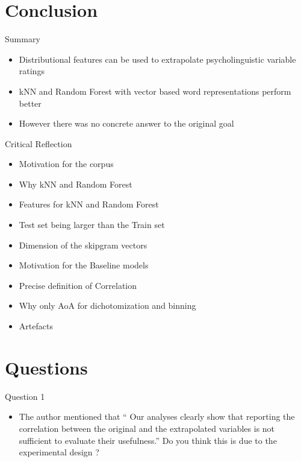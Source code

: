 \documentclass{beamer}
\begin{document}


\section{Conclusion}
\begin{frame}{Summary}
    \begin{itemize}
        \item Distributional features can be used to extrapolate psycholinguistic variable ratings
        \item kNN and Random Forest with vector based word representations perform better
        \item However there was no concrete answer to the original goal
    \end{itemize}
\end{frame}

\begin{frame}{Critical Reflection}
    \begin{itemize}
        \item Motivation for the corpus
        \item Why kNN and Random Forest
        \item Features for kNN and Random Forest
        \item Test set being larger than the Train set
        \item Dimension of the skipgram vectors
        \item Motivation for the Baseline models
        \item Precise definition of Correlation
        \item Why only AoA for dichotomization and binning
        \item Artefacts
    \end{itemize}
\end{frame}

\section{Questions}
\begin{frame}{Question 1}
    \begin{itemize}
        \item  The author mentioned that “ Our analyses clearly show that reporting the correlation between the original and the extrapolated variables is not sufficient to evaluate their usefulness.” Do you think this is due to the experimental design ?
    \end{itemize}
\end{frame}
\end{document}
